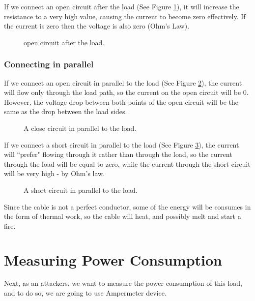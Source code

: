 If we connect an open circuit after the load (See Figure \ref{fig:circuit2}), it
will increase the resistance to a very high value, causing the current to become
zero effectively. If the current is zero then the voltage is also zero (Ohm's
Law).

\begin{figure}[!ht]
    \centering
    
    \caption{open circuit after the load.} \label{fig:circuit2}
\end{figure}

\subsubsection{Connecting in parallel}

If we connect an open circuit in parallel to the load (See Figure
\ref{fig:circuit3}), the current will flow only through the load path, so the
current on the open circuit will be 0. However, the voltage drop between both
points of the open circuit will be the same as the drop between the load sides.

\begin{figure}[!ht]
    \centering
    
    \caption{A close circuit in parallel to the load.} \label{fig:circuit3}
\end{figure}

If we connect a short circuit in parallel to the load (See Figure
\ref{fig:circuit4}), the current will ``prefer" flowing through it rather than
through the load, so the current through the load will be equal to zero, while
the current through the short circuit will be very high - by Ohm's law.

\begin{figure}[!ht]
    \centering
    
    \caption{A short circuit in parallel to the load.} \label{fig:circuit4}
\end{figure}

Since the cable is not a perfect conductor, some of the energy will be consumes
in the form of thermal work, so the cable will heat, and possibly melt and start
a fire.

\section{Measuring Power Consumption}

Next, as an attackers, we want to measure the power consumption of this load,
and to do so, we are going to use Ampermeter device.

